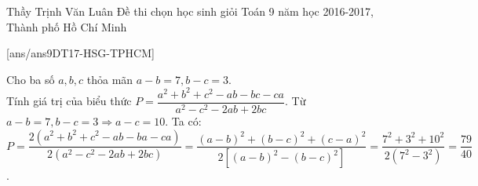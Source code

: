 \begin{name}
{Thầy  Trịnh Văn Luân}
{Đề thi chọn học sinh giỏi Toán 9 năm học 2016-2017, Thành phố Hồ Chí Minh}
\end{name}
\setcounter{ex}{0}
[ans/ans9DT17-HSG-TPHCM]
\begin{ex}%
Cho ba số $a, b, c$ thỏa mãn $a-b= 7, b-c= 3$.\\
Tính giá trị của biểu thức $P= \dfrac{a^2+b^2+c^2- ab-bc-ca}{a^2-c^2- 2ab+ 2bc}$.
\loigiai
    {
        Từ $a-b=7, b-c=3 \Rightarrow a-c=10$. Ta có:\\
        $P= \dfrac{2(a^2+b^2+c^2-ab-ba-ca)}{2(a^2-c^2-2ab+2bc)}= \dfrac{(a-b)^2+ (b-c)^2+ (c-a)^2}{2[(a-b)^2-(b-c)^2]}= \dfrac{7^2+ 3^2+ 10^2}{2(7^2- 3^2)}= \dfrac{79}{40}$.
    }
\end{ex}


